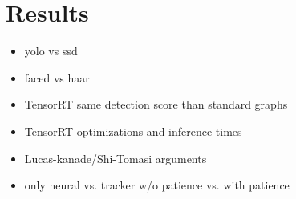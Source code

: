 \chapter{Results}
\label{chap:3_results}
\begin{itemize}
	\item yolo vs ssd
	\item faced vs haar
	\item TensorRT same detection score than standard graphs
	\item TensorRT optimizations and inference times
	\item Lucas-kanade/Shi-Tomasi arguments
	
	\item only neural vs. tracker w/o patience vs. with patience
\end{itemize}
